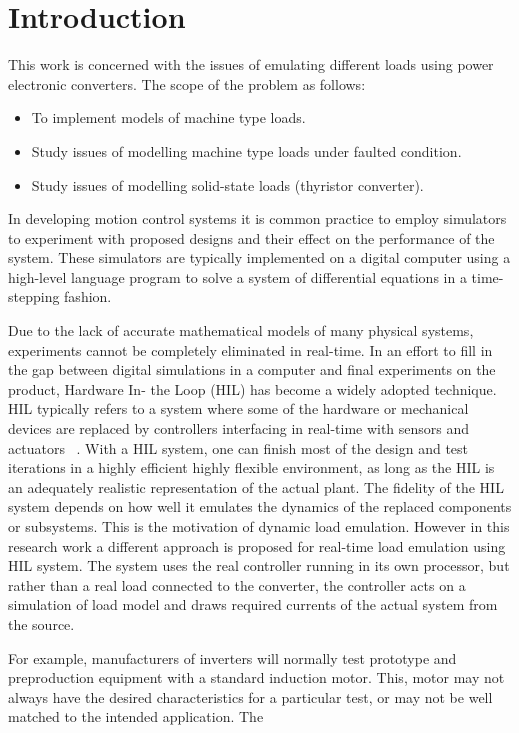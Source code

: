 \chapter{Introduction}
This work is concerned with the issues of emulating different loads using power electronic converters. The scope of the problem as follows:
\begin{itemize}
\item To implement models of machine type loads.
\item Study issues of modelling machine type loads under faulted condition.
\item Study issues of modelling solid-state loads (thyristor converter).
\end{itemize}
In developing motion control systems it is common
practice to employ simulators to experiment with proposed designs and their effect on the performance of the system. These simulators are typically implemented
on a digital computer using a high-level language program to solve a system of differential equations in a time-stepping fashion. \par
Due to the lack of 
accurate mathematical models of many physical systems, experiments cannot be completely
eliminated in real-time. In an effort to fill in the gap between digital simulations in a computer and final
experiments on the product, Hardware In- the Loop (HIL) has become a widely adopted technique.
HIL typically refers to a system where some of the hardware or mechanical devices are replaced by
controllers interfacing in real-time with sensors and actuators ~\cite{peter}. With a HIL system, one can finish most of the design and test iterations in a highly efficient highly flexible environment, as long as the HIL is an adequately realistic representation of the actual plant. The fidelity of the HIL system depends on
how well it emulates the dynamics of the replaced components or subsystems. This is the motivation
of dynamic load emulation. However in this research work a different  approach is proposed for real-time load emulation using HIL system. The system  uses the real controller running in its own processor, but rather than a real load  connected to the converter, the controller acts on a simulation of load model  and draws required currents of the actual system from the source.\par 
 For example, manufacturers of inverters will normally test prototype and preproduction equipment with a standard induction motor. This, motor may not always have the desired characteristics for a particular test, or may  not be well matched to the intended application. The
